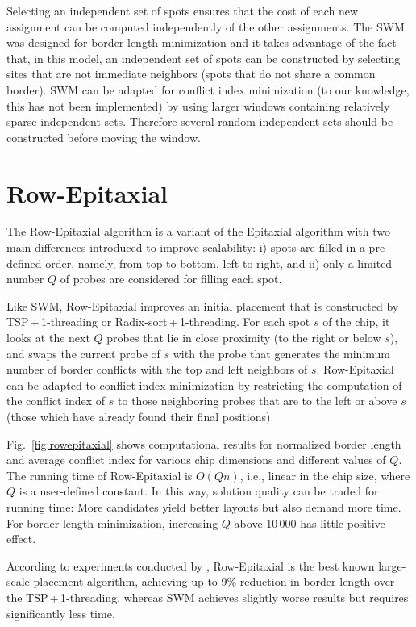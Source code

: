Selecting an independent set of spots ensures that the cost of each
new assignment can be computed independently of the other assignments.
The SWM was designed for border length minimization and it takes
advantage of the fact that, in this model, an independent set of spots
can be constructed by selecting sites that are not immediate
neighbors (spots that do not share a common border).
SWM can be adapted for conflict index minimization (to our knowledge,
this has not been implemented) by using larger windows containing
relatively sparse independent sets. Therefore several random
independent sets should be constructed before moving the window.


\section{Row-Epitaxial}
\label{sec:placement_reptx}

The Row-Epitaxial algorithm is a variant of the Epitaxial algorithm
with two main differences introduced to improve scalability: i) spots
are filled in a pre-defined order, namely, from top to bottom, left to
right, and ii) only a limited number $Q$ of probes are considered
for filling each spot.

Like SWM, Row-Epitaxial improves an initial placement that is
constructed by TSP\,+\,1-threading or Radix-sort\,+\,1-threading. For
each spot $s$ of the chip, it looks at the next $Q$ probes that lie in
close proximity (to the right or below $s$), and swaps the current
probe of $s$ with the probe that generates the minimum number of
border conflicts with the top and left neighbors of $s$.
Row-Epitaxial can be adapted to conflict index minimization by
restricting the computation of the conflict index of $s$ to those
neighboring probes that are to the left or above $s$ (those which have
already found their final positions).

Fig.~\ref{fig:rowepitaxial} shows computational results for normalized border
length and average conflict index for various chip dimensions and different
values of $Q$.  The running time of Row-Epitaxial is $O(Qn)$, i.e., linear in
the chip size, where $Q$ is a user-defined constant.  In this way, solution
quality can be traded for running time: More candidates yield better layouts
but also demand more time.  For border length minimization, increasing $Q$
above 10\,000 has little positive effect.

According to experiments conducted by \citet{Kahng2003},
Row-Epitaxial is the best known large-scale placement algorithm,
achieving up to 9\% reduction in border length over the
TSP\,+\,1-threading, whereas SWM achieves slightly worse results but
requires significantly less time.


